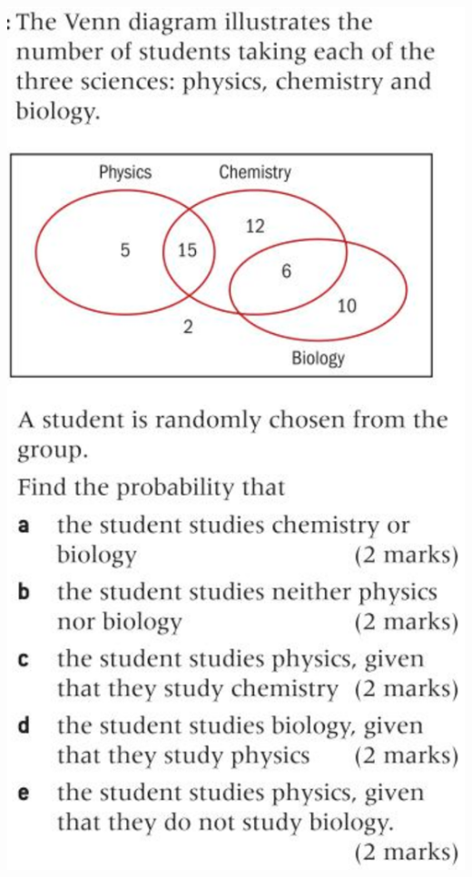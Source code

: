 \documentclass[12pt, twoside]{article}
\begin{document}
\begin{enumerate}
\includegraphics[scale=0.5]{../graphics/problem15-p374.png}


\end{enumerate}
\end{document}
